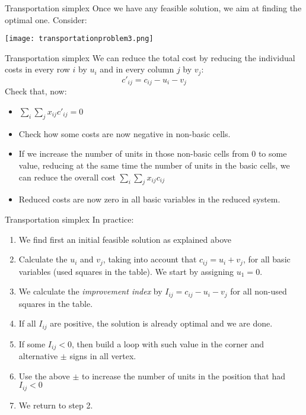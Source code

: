 \documentclass{beamer}
\begin{document}
\begin{frame}{Transportation simplex}
  Once we have any feasible solution, we aim at finding the optimal one. Consider:
  \begin{center}
    \texttt{[image: transportationproblem3.png]}
  \end{center}

\end{frame}

\begin{frame}{Transportation simplex}
  We can reduce the total cost by reducing the individual costs in every row $i$ by $u_i$ and in every column $j$ by $v_j$:
  \[c'_{ij}=c_{ij}-u_i-v_j\]
  Check that, now:
  \begin{itemize}
    \item $\sum_i \sum_j x_{ij} c'_{ij}=0$
    \item Check how some costs are now negative in non-basic cells. 
    \item If we increase the number of units in those non-basic cells from 0 to some value, reducing at the same time the number of units in the basic cells, we can reduce the overall cost $\sum_i \sum_j x_{ij} c_{ij}$
    \item Reduced costs are now zero in all basic variables in the reduced system.
  \end{itemize} 

\end{frame}

\begin{frame}{Transportation simplex}
In practice:
\begin{enumerate}
  \item We find first an initial feasible solution as explained above
  \item Calculate the $u_i$ and $v_j$, taking into account that $c_{ij}=u_i+v_j$, for all basic variables (used squares in the table). We start by assigning $u_1=0$.
  \item We calculate the {\em improvement index} by $I_{ij}=c_{ij}-u_i-v_j$ for all non-used squares in the table.
  \item If all $I_{ij}$ are positive, the solution is already optimal and we are done.
  \item If some $I_{ij}<0$, then build a loop with such value in the corner and alternative $\pm$ signs in all vertex. 
  \item Use the above $\pm$ to increase the number of units in the position that had $I_{ij}<0$
  \item We return to step 2.
\end{enumerate}
\end{frame}
\end{document}
